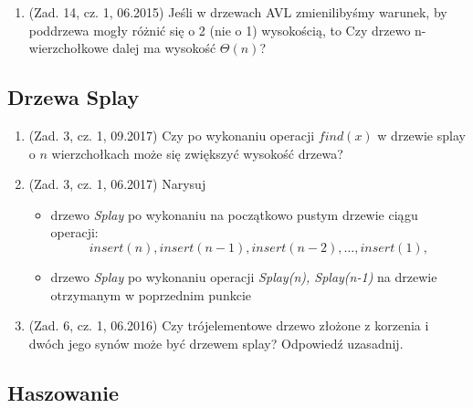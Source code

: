\documentclass[10pt]{article}%
\begin{document}
\begin{enumerate}
\item (Zad. 14, cz. 1, 06.2015) Jeśli w drzewach AVL zmienilibyśmy warunek, by poddrzewa mogły różnić się o 2 (nie o 1) wysokością, to Czy drzewo n-wierzchołkowe dalej ma wysokość $\Theta(n)$? 


\end{enumerate}


\subsection{Drzewa Splay}

\begin{enumerate}

\item (Zad. 3, cz. 1, 09.2017) Czy po wykonaniu operacji $find(x)$ w drzewie splay o $n$ wierzchołkach może się zwiększyć wysokość drzewa?

\item (Zad. 3, cz. 1, 06.2017) Narysuj 
\begin{itemize}
	\item drzewo \emph{Splay} po wykonaniu na początkowo pustym drzewie ciągu operacji: $$insert(n),insert(n-1),insert(n-2),\ldots,insert(1),$$
	
	\item drzewo \emph{Splay} po wykonaniu operacji \emph{Splay(n), Splay(n-1)} na drzewie otrzymanym w poprzednim punkcie
\end{itemize}

\item (Zad. 6, cz. 1, 06.2016) Czy trójelementowe drzewo złożone z korzenia i dwóch jego synów może być drzewem splay? Odpowiedź uzasadnij.

\end{enumerate}


\subsection{Haszowanie}
\end{document}
